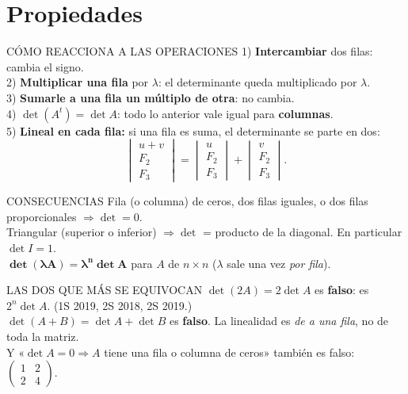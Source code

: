 \section{Propiedades}
\begin{sello}{CÓMO REACCIONA A LAS OPERACIONES}
1) \textbf{Intercambiar} dos filas: cambia el signo.\\
2) \textbf{Multiplicar una fila} por $\lambda$: el determinante queda multiplicado por $\lambda$.\\
3) \textbf{Sumarle a una fila un múltiplo de otra}: no cambia.\\
4) $\det(A^t)=\det A$: todo lo anterior vale igual para \textbf{columnas}.\\
5) \textbf{Lineal en cada fila:} si una fila es suma, el determinante se parte en dos:
\[\begin{vmatrix}u+v\\ F_2\\ F_3\end{vmatrix}=\begin{vmatrix}u\\ F_2\\ F_3\end{vmatrix}+\begin{vmatrix}v\\ F_2\\ F_3\end{vmatrix}.\]
\end{sello}
\begin{sello}{CONSECUENCIAS}
Fila (o columna) de ceros, dos filas iguales, o dos filas proporcionales $\Rightarrow\det=0$.\\
Triangular (superior o inferior) $\Rightarrow\det$ = producto de la diagonal. En particular $\det I=1$.\\
$\boldsymbol{\det(\lambda A)=\lambda^n\det A}$ para $A$ de $n\times n$ ($\lambda$ sale una vez \emph{por fila}).
\end{sello}
\begin{trampa}{LAS DOS QUE MÁS SE EQUIVOCAN}
$\det(2A)=2\det A$ es \textbf{falso}: es $2^n\det A$. (1S 2019, 2S 2018, 2S 2019.)\\
$\det(A+B)=\det A+\det B$ es \textbf{falso}. La linealidad es \emph{de a una fila}, no de toda la matriz.\\
Y «$\det A=0\Rightarrow A$ tiene una fila o columna de ceros» también es falso: $\begin{pmatrix}1&2\\2&4\end{pmatrix}$.
\end{trampa}

